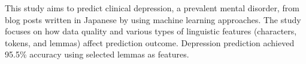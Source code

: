 This study aims to predict clinical depression, a prevalent mental disorder, from blog posts written in Japanese by using machine learning approaches. The study focuses on how data quality and various types of linguistic features (characters, tokens, and lemmas) affect prediction outcome. Depression prediction achieved 95.5\% accuracy using selected lemmas as features.
